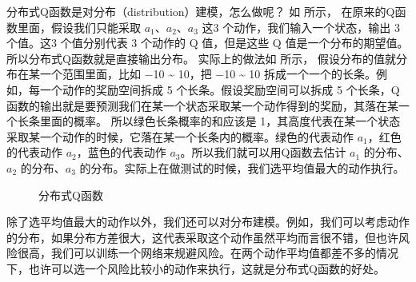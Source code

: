 分布式Q函数是对分布（distribution）建模，怎么做呢？
如 所示，
在原来的Q函数里面，假设我们只能采取 $a_1$、$a_2$、$a_3$ 这3 个动作，我们输入一个状态，输出 3 个值。这3 个值分别代表 3 个动作的 Q 值，但是这些 Q 值是一个分布的期望值。所以分布式Q函数就是直接输出分布。
实际上的做法如 所示，
假设分布的值就分布在某一个范围里面，比如 $-$10 \~{} 10，把 $-$10 \~{} 10 拆成一个一个的长条。例如，每一个动作的奖励空间拆成 5 个长条。假设奖励空间可以拆成 5 个长条，Q函数的输出就是要预测我们在某一个状态采取某一个动作得到的奖励，其落在某一个长条里面的概率。
所以绿色长条概率的和应该是 1，其高度代表在某一个状态采取某一个动作的时候，它落在某一个长条内的概率。绿色的代表动作 $a_1$，红色的代表动作 $a_2$，蓝色的代表动作 $a_3$。所以我们就可以用Q函数去估计 $a_1$ 的分布、$a_2$ 的分布、$a_3$ 的分布。实际上在做测试的时候，我们选平均值最大的动作执行。

\begin{figure}[htb]
    \centering
    \caption{分布式Q函数}
    \label{fig:distributional_q_2}
\end{figure}

除了选平均值最大的动作以外，我们还可以对分布建模。例如，我们可以考虑动作的分布，如果分布方差很大，这代表采取这个动作虽然平均而言很不错，但也许风险很高，我们可以训练一个网络来规避风险。在两个动作平均值都差不多的情况下，也许可以选一个风险比较小的动作来执行，这就是分布式Q函数的好处。

